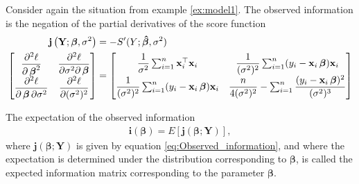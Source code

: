 \begin{example} \label{ex:Observed_information}
    Consider again the situation from example \ref{ex:model1}. The observed information is the negation of the partial derivatives of the score function
    \begin{align*}
         \textbf{j}\left(\textbf{Y}; \boldsymbol{\beta}, \sigma^2 \right) &= - S'(Y; \operatorname{\boldsymbol{\hat{\beta}}}, \sigma^2) \\
         \begin{bmatrix}
            \dfrac{\partial^2 \ell}{\partial \operatorname{\boldsymbol{\beta}}^2} & \dfrac{\partial^2 \ell}{\partial \sigma^2 \partial \operatorname{\boldsymbol{\beta}}} \\
            \dfrac{\partial^2 \ell}{\partial \operatorname{\boldsymbol{\beta}} \partial \sigma^2} & \dfrac{\partial^2 \ell}{\partial (\sigma^2)^2}
         \end{bmatrix}
         &=
         \begin{bmatrix}
            \dfrac{1}{\sigma^2} \sum_{i=1}^n \textbf{x}_i^\top \textbf{x}_i & \dfrac{1}{(\sigma^2)^2} \sum_{i=1}^n (y_i - \textbf{x}_i \operatorname{\boldsymbol{\beta}}) \textbf{x}_i \\
            \dfrac{1}{(\sigma^2)^2} \sum_{i=1}^n (y_i - \textbf{x}_i \operatorname{\boldsymbol{\beta}}) \textbf{x}_i & \dfrac{n}{4 (\sigma^2)^2} - \sum_{i=1}^n \dfrac{(y_i - \textbf{x}_i \operatorname{\boldsymbol{\beta}})^2}{(\sigma^2)^3}
         \end{bmatrix}
    \end{align*}
\end{example}

\begin{definition} 
\label{def:expected_information}
The expectation of the observed information 
\begin{align}
    \textbf{i}(\boldsymbol{\beta}) = E[\textbf{j}(\boldsymbol{\beta};\textbf{Y})],
\end{align}
where $\textbf{j}(\boldsymbol{\beta};\textbf{Y})$ is given by equation \eqref{eq:Observed_information}, and where the expectation is determined under the distribution corresponding to $\boldsymbol{\beta}$, is called the expected information matrix corresponding to the parameter $\boldsymbol{\beta}$.
\end{definition}

